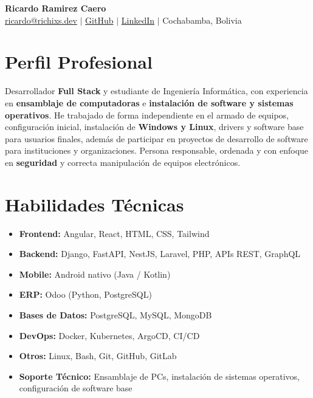 \documentclass[11pt,a4paper]{article}
\begin{document}
	
	\begin{center}
		{\Huge \textbf{Ricardo Ramirez Caero}}\\
		\vspace{2mm}
		\href{mailto:ricardo@richixs.dev}{ricardo@richixs.dev} $\mid$
		\href{https://github.com/Richixs}{GitHub} $\mid$
		\href{https://linkedin.com/in/richixs}{LinkedIn} $\mid$
		Cochabamba, Bolivia
	\end{center}
	
	\section*{Perfil Profesional}
	Desarrollador \textbf{Full Stack} y estudiante de Ingeniería Informática, con experiencia en \textbf{ensamblaje de computadoras} e \textbf{instalación de software y sistemas operativos}. He trabajado de forma independiente en el armado de equipos, configuración inicial, instalación de \textbf{Windows y Linux}, drivers y software base para usuarios finales, además de participar en proyectos de desarrollo de software para instituciones y organizaciones. Persona responsable, ordenada y con enfoque en \textbf{seguridad} y correcta manipulación de equipos electrónicos.
	
	\section*{Habilidades Técnicas}
	\begin{itemize}[leftmargin=*]
		\item \textbf{Frontend:} Angular, React, HTML, CSS, Tailwind
		\item \textbf{Backend:} Django, FastAPI, NestJS, Laravel, PHP, APIs REST, GraphQL
		\item \textbf{Mobile:} Android nativo (Java / Kotlin)
		\item \textbf{ERP:} Odoo (Python, PostgreSQL)
		\item \textbf{Bases de Datos:} PostgreSQL, MySQL, MongoDB
		\item \textbf{DevOps:} Docker, Kubernetes, ArgoCD, CI/CD
		\item \textbf{Otros:} Linux, Bash, Git, GitHub, GitLab
		\item \textbf{Soporte Técnico:} Ensamblaje de PCs, instalación de sistemas operativos, configuración de software base
	\end{itemize}
	
\end{document}
